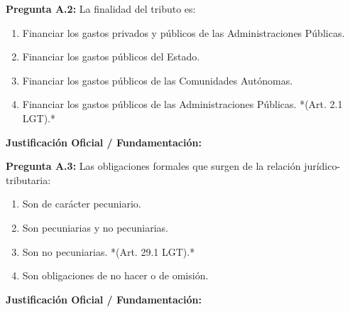 \documentclass[11pt,a4paper,openany]{article}
\begin{document}
\noindent\textbf{\sffamily Pregunta A.2:} La finalidad del tributo es:\\[0.15cm]
\begin{enumerate}[label=\textbf{\alph*)},leftmargin=1.8em,itemsep=1.5pt,topsep=2pt,partopsep=0pt,parsep=0pt]
    \item Financiar los gastos privados y públicos de las Administraciones Públicas.
    \item Financiar los gastos públicos del Estado.
    \item Financiar los gastos públicos de las Comunidades Autónomas.
    \item Financiar los gastos públicos de las Administraciones Públicas. *(Art. 2.1 LGT).*
\end{enumerate}
\begin{solucionBox}
\textbf{Justificación Oficial / Fundamentación:}\\[0.1cm]

\end{solucionBox}
\vspace{0.35cm}

\noindent\textbf{\sffamily Pregunta A.3:} Las obligaciones formales que surgen de la relación jurídico-tributaria:\\[0.15cm]
\begin{enumerate}[label=\textbf{\alph*)},leftmargin=1.8em,itemsep=1.5pt,topsep=2pt,partopsep=0pt,parsep=0pt]
    \item Son de carácter pecuniario.
    \item Son pecuniarias y no pecuniarias.
    \item Son no pecuniarias. *(Art. 29.1 LGT).*
    \item Son obligaciones de no hacer o de omisión.
\end{enumerate}
\begin{solucionBox}
\textbf{Justificación Oficial / Fundamentación:}\\[0.1cm]

\end{solucionBox}
\vspace{0.35cm}
\end{document}
